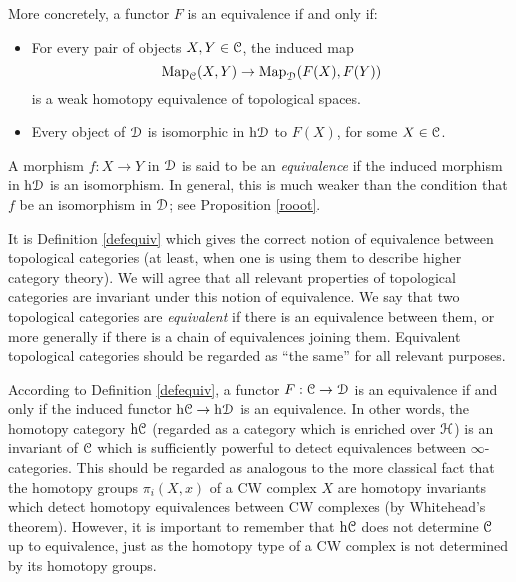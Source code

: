 More concretely, a functor $F$ is an equivalence if and only if:

\begin{itemize}
\item For every pair of objects $X,Y \in \operatorname{\mathcal{C}}$, the induced map
$$ \operatorname{{Map}}_{\operatorname{\mathcal{C}}}(X,Y) \rightarrow \operatorname{{Map}}_{\operatorname{\mathcal{D}}}(F(X),F(Y))$$ is a weak homotopy equivalence of topological spaces.

\item Every object of $\operatorname{\mathcal{D}}$ is isomorphic in $\rm{h} \it{ \operatorname{\mathcal{D}}}$ to $F(X)$, for some $X \in \operatorname{\mathcal{C}}$.
\end{itemize}

\begin{remark}
A morphism $f: X \rightarrow Y$ in $\operatorname{\mathcal{D}}$ is said to be an {\it equivalence} if the induced morphism in $\rm{h} \it{ \operatorname{\mathcal{D}}}$ is an isomorphism. In general, this is much weaker than the condition that $f$ be an isomorphism in $\operatorname{\mathcal{D}}$; see Proposition \ref{rooot}.
\end{remark}

It is Definition \ref{defequiv} which gives the correct notion of equivalence between topological categories (at least, when one is using them to describe higher category theory). We will agree that all relevant properties of topological categories are invariant under this notion of equivalence. We say that two topological categories are {\it equivalent} if there is an equivalence between them, or more generally if there is a chain of equivalences joining them. Equivalent topological categories should be regarded as ``the same'' for all relevant purposes.

\begin{remark}
According to Definition \ref{defequiv}, a functor $F: \operatorname{\mathcal{C}} \rightarrow \operatorname{\mathcal{D}}$ is an equivalence if and only if the induced functor $\rm{h} \it{\operatorname{\mathcal{C}}} \rightarrow \rm{h} \it{ \operatorname{\mathcal{D}}}$ is an equivalence. In other words, the homotopy category $\rm{h} \it{\operatorname{\mathcal{C}}}$ (regarded as a category which is enriched over $\operatorname{\mathcal{H}}$) is an invariant of $\operatorname{\mathcal{C}}$
which is sufficiently powerful to detect equivalences between $\infty$-categories.
This should be regarded as analogous to the more classical fact that the homotopy groups $\pi_i(X,x)$ of a CW complex $X$ are homotopy invariants which detect homotopy equivalences between CW complexes (by Whitehead's theorem). However, it is important to remember that $\rm{h} \it{ \operatorname{\mathcal{C}}}$ does not determine $\operatorname{\mathcal{C}}$ up to equivalence, just as the homotopy type of a CW complex is not determined by its homotopy groups.
\end{remark}


